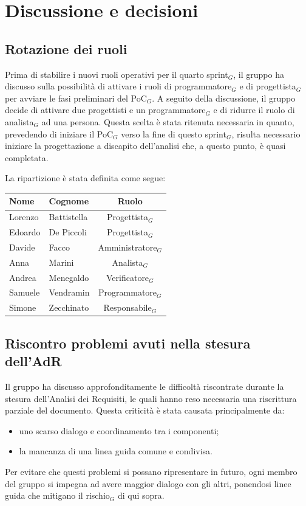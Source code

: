 \documentclass[a4paper, 10pt, colorlinks=true, linkcolor=black, urlcolor=blue, citecolor=blue, hidelinks]{article}
\begin{document}
\section{Discussione e decisioni}

\subsection{Rotazione dei ruoli}
Prima di stabilire i nuovi ruoli operativi per il quarto sprint$_G$, il gruppo ha discusso sulla possibilità di attivare i ruoli di programmatore$_G$ e di progettista$_G$ per avviare le fasi preliminari del PoC$_G$. 
A seguito della discussione, il gruppo decide di attivare due progettisti e un programmatore$_G$ e di ridurre il ruolo di analista$_G$ ad una persona. Questa scelta è stata ritenuta necessaria in quanto, prevedendo di iniziare il PoC$_G$ verso la fine di questo sprint$_G$, risulta necessario iniziare la progettazione a discapito dell'analisi che, a questo punto, è quasi completata.

La ripartizione è stata definita come segue:
\begin{center}
    \begin{tabular}{|l|l|c|}
        \hline
        \textbf{Nome} & \textbf{Cognome} & \textbf{Ruolo} \\
        \hline
        Lorenzo & Battistella & Progettista$_G$ \\
        \hline
        Edoardo & De Piccoli & Progettista$_G$ \\
        \hline
        Davide & Facco & Amministratore$_G$ \\ 
        \hline
        Anna & Marini & Analista$_G$ \\
        \hline
        Andrea & Menegaldo & Verificatore$_G$ \\
        \hline
        Samuele & Vendramin & Programmatore$_G$ \\        
        \hline  
        Simone & Zecchinato & Responsabile$_G$ \\
        \hline  
    \end{tabular}
\end{center}

\subsection{Riscontro problemi avuti nella stesura dell'AdR}
Il gruppo ha discusso approfonditamente le difficoltà riscontrate durante la stesura dell'Analisi dei Requisiti, le quali hanno reso necessaria una riscrittura parziale del documento. Questa criticità è stata causata principalmente da:
\begin{itemize}
    \item uno scarso dialogo e coordinamento tra i componenti;
    \item la mancanza di una linea guida comune e condivisa.
\end{itemize}
Per evitare che questi problemi si possano ripresentare in futuro, ogni membro del gruppo si impegna ad avere maggior dialogo con gli altri, ponendosi linee guida che mitigano il rischio$_G$ di qui sopra. 
\end{document}
